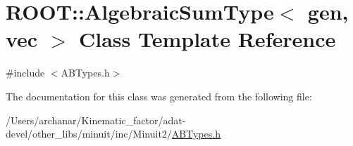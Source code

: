 \hypertarget{classROOT_1_1Minuit2_1_1AlgebraicSumType_3_01gen_00_01vec_01_4}{}\section{R\+O\+OT\+:\+:Algebraic\+Sum\+Type$<$ gen, vec $>$ Class Template Reference}
\label{classROOT_1_1Minuit2_1_1AlgebraicSumType_3_01gen_00_01vec_01_4}


{\ttfamily \#include $<$A\+B\+Types.\+h$>$}



The documentation for this class was generated from the following file\+:\begin{DoxyCompactItemize}
\item 
/\+Users/archanar/\+Kinematic\+\_\+factor/adat-\/devel/other\+\_\+libs/minuit/inc/\+Minuit2/\mbox{\hyperlink{adat-devel_2other__libs_2minuit_2inc_2Minuit2_2ABTypes_8h}{A\+B\+Types.\+h}}\end{DoxyCompactItemize}
